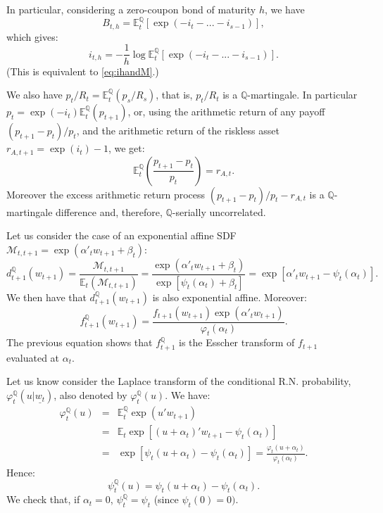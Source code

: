 \documentclass[
  12pt,
]{book}
\theoremstyle{definition}
\theoremstyle{definition}
\theoremstyle{definition}
\theoremstyle{definition}
\theoremstyle{remark}
\begin{document}
In particular, considering a zero-coupon bond of maturity \(h\), we have
\[
B_{t,h} = \mathbb{E}^{\mathbb{Q}}_t[\exp(-i_{t}-...-i_{s-1})],
\]
which gives:
\begin{equation}
\boxed{i_{t,h}=-\frac{1}{h}\log \mathbb{E}^{\mathbb{Q}}_t[\exp(-i_{t}-...-i_{s-1})].}\label{eq:ihandMQ}
\end{equation}
(This is equivalent to \eqref{eq:ihandM}.)

We also have \(p_t/R_t = \mathbb{E}^{\mathbb{Q}}_t\left( p_s/R_s\right)\), that is, \(p_t/R_t\) is a \(\mathbb{Q}\)-martingale. In particular \(p_t = \exp(-i_{t})\mathbb{E}^{\mathbb{Q}}_t(p_{t+1})\), or, using the arithmetic return of any payoff \((p_{t+1}-p_t)/p_t\), and the arithmetic return of the riskless asset \(r_{A,t+1}=\exp(i_{t})-1\), we get:
\[
\mathbb{E}^{\mathbb{Q}}_t\left(\frac{p_{t+1}-p_t}{p_t}\right)=r_{A,t}.
\]
Moreover the excess arithmetic return process \((p_{t+1}-p_t)/p_t-r_{A,t}\) is a \(\mathbb{Q}\)-martingale difference and, therefore, \(\mathbb{Q}\)-serially uncorrelated.

Let us consider the case of an exponential affine SDF \(\mathcal{M}_{t,t+1}=\exp(\alpha'_t w_{t+1}+\beta_t)\):
\[
d^{\mathbb{Q}}_{t+1}(w_{t+1}) = \frac{\mathcal{M}_{t,t+1}}{\mathbb{E}_t(\mathcal{M}_{t,t+1})} = \frac{\exp(\alpha'_t
w_{t+1}+\beta_t)}{\exp[\psi_t(\alpha_t)+\beta_t]} = \exp[\alpha'_t w_{t+1}-\psi_t(\alpha_t)].
\]
We then have that \(d^{\mathbb{Q}}_{t+1}(w_{t+1})\) is also exponential affine. Moreover:
\[
f^{\mathbb{Q}}_{t+1} (w_{t+1}) = \frac{f_{t+1} (w_{t+1}) \exp (\alpha'_t w_{t+1})}{\varphi_t (\alpha_t)}.
\]
The previous equation shows that \(f^{\mathbb{Q}}_{t+1}\) is the Esscher transform of \(f_{t+1}\) evaluated at \(\alpha_t\).

Let us know consider the Laplace transform of the conditional R.N. probability, \(\varphi^{\mathbb{Q}}_t(u|\underline{w_t})\), also denoted by \(\varphi^{\mathbb{Q}}_t(u)\). We have:
\begin{eqnarray*}
\varphi^{\mathbb{Q}}_t(u) &=& \mathbb{E}^{\mathbb{Q}}_t \exp(u' w_{t+1}) \\
&=& \mathbb{E}_t \exp[(u+\alpha_t)'w_{t+1}-\psi_t(\alpha_t)] \\
&=& \exp[\psi_t(u+\alpha_t)-\psi_t(\alpha_t)] =
\frac{\varphi_t(u+\alpha_t)}{\varphi_t(\alpha_t)}.
\end{eqnarray*}
Hence:
\begin{equation}
\boxed{\psi^{\mathbb{Q}}_t(u) = \psi_t(u+\alpha_t)-\psi_t(\alpha_t).}\label{eq:transfoPQ}
\end{equation}
We check that, if \(\alpha_t=0\), \(\psi^{\mathbb{Q}}_t=\psi_t\) (since \(\psi_t(0)=0)\).
\end{document}
